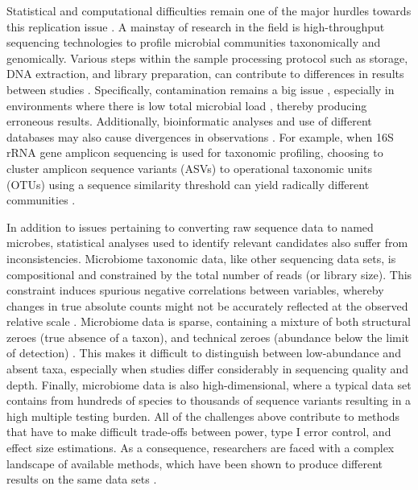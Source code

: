Statistical and computational difficulties remain one of the major hurdles towards this replication issue \cite{li2015microbiome, li2019comparative}. A mainstay of research in the field is high-throughput sequencing technologies to profile microbial communities taxonomically and genomically. Various steps within the sample processing protocol such as storage, DNA extraction, and library preparation, can contribute to differences in results between studies \cite{clausen2021evaluating}. Specifically, contamination remains a big issue \cite{davis2018simple}, especially in environments where there is low total microbial load \cite{eisenhofer2019contamination}, thereby producing erroneous results. Additionally, bioinformatic analyses and use of different databases may also cause divergences in observations \cite{moossavi2020biological}. For example, when 16S rRNA gene amplicon sequencing is used for taxonomic profiling, choosing to cluster amplicon sequence variants (ASVs) to operational taxonomic units (OTUs) using a sequence similarity threshold can yield radically different communities \cite{chiarello2022ranking, moossavi2020biological}.   

In addition to issues pertaining to converting raw sequence data to named microbes, statistical analyses used to identify relevant candidates also suffer from inconsistencies. Microbiome taxonomic data, like other sequencing data sets, is compositional \cite{gloor2017microbiome, quinn2019field} and constrained by the total number of reads (or library size). This constraint induces spurious negative correlations between variables, whereby changes in true absolute counts might not be accurately reflected at the observed relative scale \cite{lin2020analysis, morton2019establishing}. Microbiome data is sparse, containing a mixture of both structural zeroes (true absence of a taxon), and technical zeroes (abundance below the limit of detection) \cite{kaul2017analysis, silverman2020naught}. This makes it difficult to distinguish between low-abundance and absent taxa, especially when studies differ considerably in sequencing quality and depth. Finally, microbiome data is also high-dimensional, where a typical data set contains from hundreds of species to thousands of sequence variants resulting in a high multiple testing burden. All of the challenges above contribute to methods that have to make difficult trade-offs between power, type I error control, and effect size estimations. As a consequence, researchers are faced with a complex landscape of available methods, which have been shown to produce different results on the same data sets \cite{nearing2022microbiome}.   

